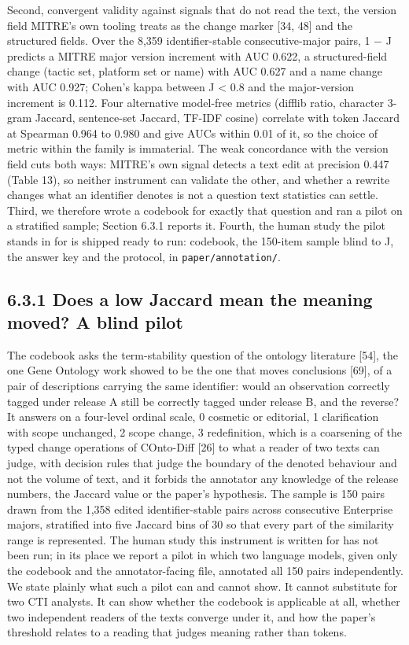 \documentclass[11pt,a4paper]{article}
\begin{document}
Second, convergent validity against signals that do not read the text, the version field MITRE's own tooling treats as the change marker [34, 48] and the structured fields. Over the 8,359 identifier-stable consecutive-major pairs, 1 − J predicts a MITRE major version increment with AUC 0.622, a structured-field change (tactic set, platform set or name) with AUC 0.627 and a name change with AUC 0.927; Cohen's kappa between J < 0.8 and the major-version increment is 0.112. Four alternative model-free metrics (difflib ratio, character 3-gram Jaccard, sentence-set Jaccard, TF-IDF cosine) correlate with token Jaccard at Spearman 0.964 to 0.980 and give AUCs within 0.01 of it, so the choice of metric within the family is immaterial. The weak concordance with the version field cuts both ways: MITRE's own signal detects a text edit at precision 0.447 (Table 13), so neither instrument can validate the other, and whether a rewrite changes what an identifier denotes is not a question text statistics can settle. Third, we therefore wrote a codebook for exactly that question and ran a pilot on a stratified sample; Section 6.3.1 reports it. Fourth, the human study the pilot stands in for is shipped ready to run: codebook, the 150-item sample blind to J, the answer key and the protocol, in \texttt{paper/annotation/}.

\subsection{6.3.1 Does a low Jaccard mean the meaning moved? A blind pilot}

The codebook asks the term-stability question of the ontology literature [54], the one Gene Ontology work showed to be the one that moves conclusions [69], of a pair of descriptions carrying the same identifier: would an observation correctly tagged under release A still be correctly tagged under release B, and the reverse? It answers on a four-level ordinal scale, 0 cosmetic or editorial, 1 clarification with scope unchanged, 2 scope change, 3 redefinition, which is a coarsening of the typed change operations of COnto-Diff [26] to what a reader of two texts can judge, with decision rules that judge the boundary of the denoted behaviour and not the volume of text, and it forbids the annotator any knowledge of the release numbers, the Jaccard value or the paper's hypothesis. The sample is 150 pairs drawn from the 1,358 edited identifier-stable pairs across consecutive Enterprise majors, stratified into five Jaccard bins of 30 so that every part of the similarity range is represented. The human study this instrument is written for has not been run; in its place we report a pilot in which two language models, given only the codebook and the annotator-facing file, annotated all 150 pairs independently. We state plainly what such a pilot can and cannot show. It cannot substitute for two CTI analysts. It can show whether the codebook is applicable at all, whether two independent readers of the texts converge under it, and how the paper's threshold relates to a reading that judges meaning rather than tokens.
\end{document}
